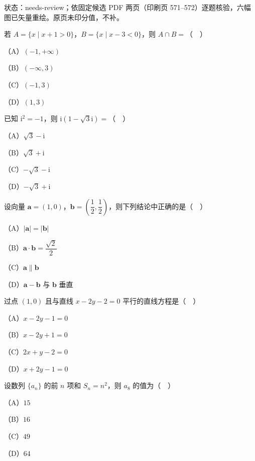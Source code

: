 

状态：needs-review；依固定候选 PDF 两页（印刷页 571–572）逐题核验，六幅图已矢量重绘。原页未印分值，不补。


\begin{question}
若 $A=\{x\mid x+1>0\}$，$B=\{x\mid x-3<0\}$，则 $A\cap B=$（　）

（A）$(-1,+\infty)$

（B）$(-\infty,3)$

（C）$(-1,3)$

（D）$(1,3)$

\end{question}
\begin{question}
已知 $\mathrm i^2=-1$，则 $\mathrm i(1-\sqrt3\mathrm i)=$（　）

（A）$\sqrt3-\mathrm i$

（B）$\sqrt3+\mathrm i$

（C）$-\sqrt3-\mathrm i$

（D）$-\sqrt3+\mathrm i$

\end{question}
\begin{question}
设向量 $\boldsymbol a=(1,0)$，$\boldsymbol b=\left(\dfrac12,\dfrac12\right)$，则下列结论中正确的是（　）

（A）$|\boldsymbol a|=|\boldsymbol b|$

（B）$\boldsymbol a\cdot\boldsymbol b=\dfrac{\sqrt2}2$

（C）$\boldsymbol a\parallel\boldsymbol b$

（D）$\boldsymbol a-\boldsymbol b$ 与 $\boldsymbol b$ 垂直

\end{question}
\begin{question}
过点 $(1,0)$ 且与直线 $x-2y-2=0$ 平行的直线方程是（　）

（A）$x-2y-1=0$

（B）$x-2y+1=0$

（C）$2x+y-2=0$

（D）$x+2y-1=0$

\end{question}
\begin{question}
设数列 $\{a_n\}$ 的前 $n$ 项和 $S_n=n^2$，则 $a_8$ 的值为（　）

（A）$15$

（B）$16$

（C）$49$

（D）$64$

\Needspace{0.4\textheight}
\end{question}
